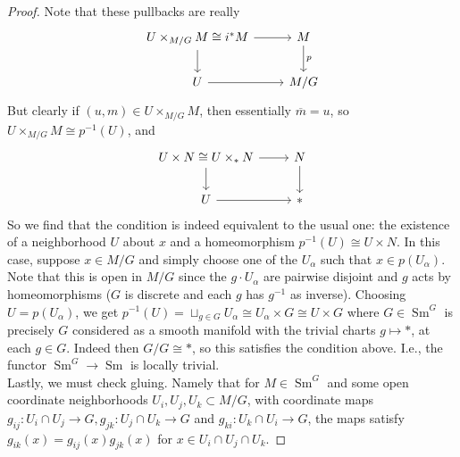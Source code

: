 \documentclass[reqno]{amsart}
\theoremstyle{definition}
\theoremstyle{remark}
\DeclareMathOperator{\Sm}{Sm}
\begin{document}
\begin{proof}
        Note that these pullbacks are really
        \begin{equation*}
        \begin{tikzcd}
            U \times_{M /G}M
            \cong i^{*}M \ar[r] \ar[d] & M \ar[d,"p"] \\
            U \ar[r] & M /G
        \end{tikzcd}
        \end{equation*}
        But clearly if
        $\left( u,m \right) \in 
        U \times_{M /G} M$, then
        essentially $\overline{m} = u$, so
        $U \times_{M /G }M \cong p^{-1}(U)$, and
        \begin{equation*}
        \begin{tikzcd}
            U \times N
            \cong U \times_{*} N \ar[r] \ar[d] & N \ar[d] \\
            U \ar[r] & *
        \end{tikzcd}
        \end{equation*}
        So we find that the condition is indeed equivalent
        to the usual one: the existence of
        a neighborhood $U$ about $x$ and a homeomorphism
        $p^{-1}(U) \cong U \times N$.
        In this case, suppose
        $x \in M /G$ and simply choose one of the
        $U_{\alpha}$ such that 
        $x \in p\left( U_{\alpha} \right) $. Note that
        this is open in $M /G$ since
        the $g \cdot  U_{\alpha}$ are pairwise disjoint
        and $g$ acts by homeomorphisms ($G$ is discrete and
        each $g$ has $g^{-1}$ as inverse).
        Choosing  $U = p\left( U_{\alpha} \right) $, we get
        $p^{-1}(U) = \sqcup_{g \in G}U_{\alpha}
        \cong U_{\alpha} \times G
        \cong U \times G$  where
        $G \in \Sm^{G}$ is precisely $G$ considered as
        a smooth manifold with the trivial charts 
        $g \mapsto *$, at
        each $g \in G$. Indeed then
        $G /G \cong *$, so
        this satisfies the condition above.
        I.e., the functor
        $\Sm^{G} \to \Sm$ is locally trivial.\\
        \linebreak
        Lastly, we must check gluing. Namely that
        for $M \in \Sm^{G}$ and
        some open coordinate neighborhoods
        $U_i,U_j,U_k \subset M /G$, with coordinate
        maps
        $g_{ij} \colon U_i \cap U_j \to G,
        g_{jk} \colon U_{j} \cap U_k \to G$ and
        $g_{ki} \colon U_{k} \cap U_i \to G$, the
        maps satisfy
        $g_{ik} (x) = g_{ij}(x) g_{jk}(x)$ for
        $x \in U_i \cap U_j \cap U_k$.

\end{proof}
\end{document}
